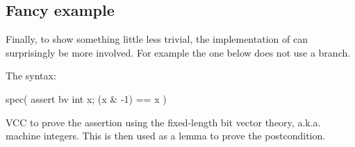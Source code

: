 \subsection{Fancy example}

Finally, 
to show something little less trivial, the implementation of  can surprisingly be more involved.
For example the one below does not use a branch.


\noindent
The syntax:
\begin{VCC}
  spec( assert {bv} \forall int x; (x & -1) == x )
\end{VCC}

\noindent
VCC to prove the assertion using the fixed-length bit vector theory, a.k.a. machine integers.
This is then used as a lemma to prove the postcondition.

